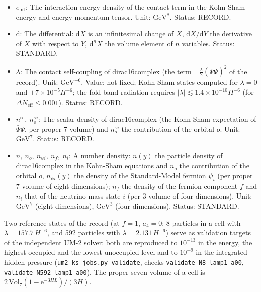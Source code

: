 \documentclass[
  10pt,
]{article}
\begin{document}
\begin{itemize}
  \(y = \ln\lvert\sin z\rvert/(6H)\), with \(y = 0\) at the fold
  (\(z = \pi/2\)) and \(y = -L\) at the regular tip; each half of a
  period of \(x_0\) is the interval \(-L \le y \le 0\). Unit: length.
  Status: DERIVED.
\item
  \(e_{\mathrm{int}}\): The interaction energy density of the contact
  term in the Kohn-Sham energy and energy-momentum tensor. Unit:
  \(\mathrm{GeV}^{8}\). Status: RECORD.
\item
  \(\mathrm{d}\): The differential: \(\mathrm{d}X\) is an infinitesimal
  change of \(X\), \(\mathrm{d}X/\mathrm{d}Y\) the derivative of \(X\)
  with respect to \(Y\), \(\mathrm{d}^nX\) the volume element of \(n\)
  variables. Status: STANDARD.
\item
  \(\lambda\): The contact self-coupling of dirac16complex (the term
  \(-\frac{\lambda}{2}(\bar\Psi\Psi)^2\) of the record). Unit:
  \(\mathrm{GeV}^{-6}\). Value: not fixed; Kohn-Sham states computed for
  \(\lambda = 0\) and \(\pm7\times10^{-5}H^{-6}\); the fold-band
  radiation requires
  \(\lvert\lambda\rvert \lesssim 1.4\times10^{-10}H^{-6}\) (for
  \(\Delta N_{\mathrm{eff}} \le 0.001\)). Status: RECORD.
\item
  \(n^{\mathrm{sc}},\ n^{\mathrm{sc}}_o\): The scalar density of
  dirac16complex (the Kohn-Sham expectation of \(\bar\Psi\Psi\), per
  proper 7-volume) and \(n^{\mathrm{sc}}_o\) the contribution of the
  orbital \(o\). Unit: \(\mathrm{GeV}^{7}\). Status: RECORD.
\item
  \(n,\ n_o,\ n_{\psi i},\ n_f,\ n_i\): A number density: \(n(y)\) the
  particle density of dirac16complex in the Kohn-Sham equations and
  \(n_o\) the contribution of the orbital \(o\), \(n_{\psi i}(y)\) the
  density of the Standard-Model fermion \(\psi_i\) (per proper 7-volume
  of eight dimensions); \(n_f\) the density of the fermion component
  \(f\) and \(n_i\) that of the neutrino mass state \(i\) (per 3-volume
  of four dimensions). Unit: \(\mathrm{GeV}^{7}\) (eight dimensions),
  \(\mathrm{GeV}^{3}\) (four dimensions). Status: STANDARD.
\end{itemize}

Two reference states of the record (at \(f = 1\), \(a_4 = 0\): 8
particles in a cell with \(\lambda = 157.7\,H^{-6}\), and 592 particles
with \(\lambda = 2.131\,H^{-6}\)) serve as validation targets of the
independent UM-2 solver: both are reproduced to \(10^{-13}\) in the
energy, the highest occupied and the lowest unoccupied level and to
\(10^{-9}\) in the integrated hidden pressure
(\texttt{um2\_ks\_jobs.py\ validate}, checks
\texttt{validate\_N8\_lamp1\_a00}, \texttt{validate\_N592\_lamp1\_a00}).
The proper seven-volume of a cell is
\(2\,\mathrm{Vol}_7(1 - \mathrm{e}^{-3HL})/(3H)\).
\end{document}
